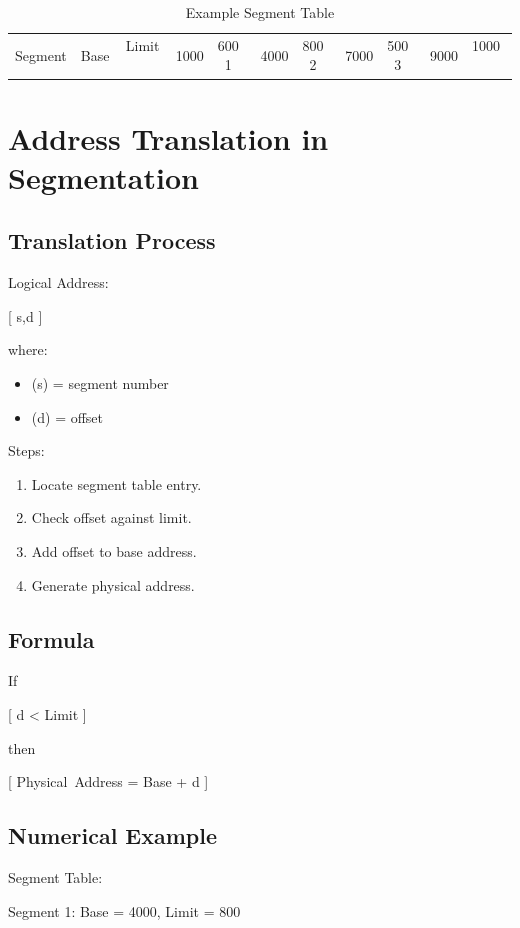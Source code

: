 \begin{table}[h]
\centering
\begin{tabular}{|c|c|c|}
\hline
Segment & Base & Limit \
 & 1000 & 600 \
1 & 4000 & 800 \
2 & 7000 & 500 \
3 & 9000 & 1000 \
\hline
\end{tabular}
\caption{Example Segment Table}
\end{table}

\section{Address Translation in Segmentation}

\subsection{Translation Process}

Logical Address:

[
\langle s,d \rangle
]

where:

\begin{itemize}
\item (s) = segment number
\item (d) = offset
\end{itemize}

Steps:

\begin{enumerate}
\item Locate segment table entry.
\item Check offset against limit.
\item Add offset to base address.
\item Generate physical address.
\end{enumerate}

\subsection{Formula}

If

[
d < Limit
]

then

[
Physical\ Address = Base + d
]

\subsection{Numerical Example}

Segment Table:

\begin{center}
Segment 1: Base = 4000, Limit = 800
\end{center}

